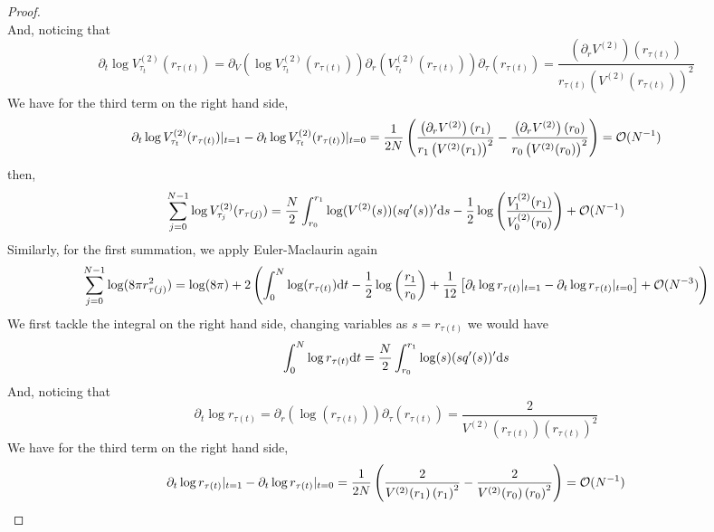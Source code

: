 \begin{proof}
\begin{equation}
\end{equation}
And, noticing that
\begin{equation}
	\partial_t \log V^{(2)}_{\tau_t}(r_{\tau(t)}) = \partial_V \left( \log V^{(2)}_{\tau_t}(r_{\tau(t)}) \right) \partial_r \left( V^{(2)}_{\tau_t}(r_{\tau(t)}) \right) \partial_\tau \left( r_{\tau(t)} \right) = \frac{\left(\partial_r V^{(2)}\right)(r_{\tau(t)})}{r_{\tau(t)} \left( V^{(2)}(r_{\tau(t)})\right)^2}
\end{equation}
We have for the third term on the right hand side, 
\begin{align}
	\partial_t \log V^{(2)}_{\tau_t}(r_{\tau(t)}) |_{t=1} - \partial_t \log V^{(2)}_{\tau_t}(r_{\tau(t)}) |_{t=0} = \frac{1}{2N} \left( \frac{\left(\partial_r V^{(2)}\right)(r_{1})}{r_1 \left( V^{(2)}(r_1)\right)^2} - \frac{\left(\partial_r V^{(2)}\right)(r_{0})}{r_0 \left( V^{(2)}(r_0)\right)^2}\right) = \mathcal{O}(N^{-1})
\end{align}
then,
\begin{equation}
	\sum_{j=0}^{N-1}  \log V^{(2)}_{\tau_j}(r_{\tau(j)})  = \frac{N}{2} \int_{r_0}^{r_1} \log(V^{(2)}(s)) (sq'(s))' \mathrm{d} s  -   \frac{1}{2} \log \left( \frac{V^{(2)}_{1}(r_1)}{V^{(2)}_{0}(r_{0})} \right) + \mathcal{O}(N^{-1})
	\label{Equation: logV annulus}
\end{equation}
Similarly, for the first summation, we apply Euler-Maclaurin again
\begin{equation}
	\sum_{j=0}^{N-1}  \log(8 \pi r^2_{\tau(j)}) = \log(8\pi) + 2 \left( \int_{0}^{N} \log(r_{\tau(t)})  \mathrm{d} t - \frac{1}{2} \log\left(\frac{r_1}{r_0}\right) + \frac{1}{12} \left[ \partial_t \log r_{\tau(t)} |_{t=1} - \partial_t \log r_{\tau(t)} |_{t=0}\right] + \mathcal{O}(N^{-3}) \right)
\end{equation}
We first tackle the integral on the right hand side, changing variables as $s = r_{\tau(t)}$ we would have
\begin{equation}
	\int_{0}^{N} \log r_{\tau(t)} \mathrm{d} t = \frac{N}{2} \int_{r_0}^{r_1} \log(s) (s q'(s))' \mathrm{d} s \\
\end{equation}
And, noticing that
\begin{equation}
	\partial_t \log r_{\tau(t)} =  \partial_r \left( \log(r_{\tau(t)}) \right) \partial_\tau \left( r_{\tau(t)} \right) = \frac{2}{V^{(2)}(r_{\tau(t)}) \left( r_{\tau(t)} \right)^2}
\end{equation}
We have for the third term on the right hand side, 
\begin{align}
	\partial_t \log  r_{\tau(t)} |_{t=1} - \partial_t \log  r_{\tau(t)}  |_{t=0}  = \frac{1}{2N} \left( \frac{2}{V^{(2)}(r_{1}) \left( r_{1} \right)^2} - \frac{2}{V^{(2)}(r_{0}) \left( r_{0} \right)^2} \right) = \Boh(N^{-1})

\end{align}
\end{proof}
